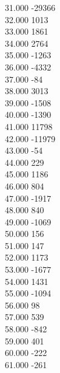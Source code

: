 { 31.000	-29366 \\
 32.000	1013 \\
 33.000	1861 \\
 34.000	2764 \\
 35.000	-1263 \\
 36.000	-4332 \\
 37.000	-84 \\
 38.000	3013 \\
 39.000	-1508 \\
 40.000	-1390 \\
 41.000	11798 \\
 42.000	-11979 \\
 43.000	-54 \\
 44.000	229 \\
 45.000	1186 \\
 46.000	804 \\
 47.000	-1917 \\
 48.000	840 \\
 49.000	-1069 \\
 50.000	156 \\
 51.000	147 \\
 52.000	1173 \\
 53.000	-1677 \\
 54.000	1431 \\
 55.000	-1094 \\
 56.000	98 \\
 57.000	539 \\
 58.000	-842 \\
 59.000	401 \\
 60.000	-222 \\
 61.000	-261 \\
}
